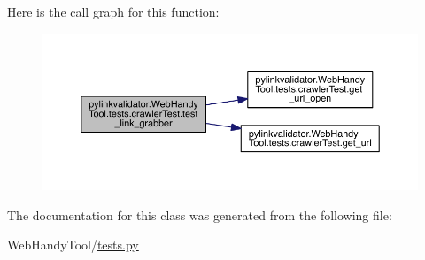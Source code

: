 Here is the call graph for this function\+:
\nopagebreak
\begin{figure}[H]
\begin{center}
\leavevmode
\includegraphics[width=350pt]{classpylinkvalidator_1_1_web_handy_tool_1_1tests_1_1crawler_test_ac00856c89d2d4130ffe0ca385df3f679_cgraph}
\end{center}
\end{figure}




The documentation for this class was generated from the following file\+:\begin{DoxyCompactItemize}
\item 
Web\+Handy\+Tool/\hyperlink{tests_8py}{tests.\+py}\end{DoxyCompactItemize}
